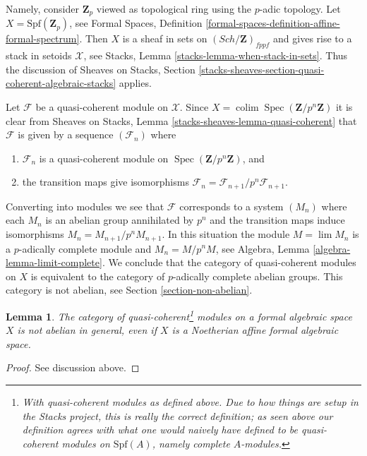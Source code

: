 \documentclass[10pt,a4paper]{amsart}
\theoremstyle{plain}
\newtheorem{lemma}[subsection]{Lemma}
\theoremstyle{definition}
\theoremstyle{remark}
\numberwithin{equation}{subsection}
\def\lim{\mathop{\mathrm{lim}}\nolimits}
\def\colim{\mathop{\mathrm{colim}}\nolimits}
\def\Spec{\mathop{\mathrm{Spec}}}
\def\Sch{\mathit{Sch}}
\begin{document}
\medskip\noindent
Namely, consider $\mathbf{Z}_p$ viewed as topological ring using
the $p$-adic topology. Let $X = \text{Spf}(\mathbf{Z}_p)$, see
Formal Spaces, Definition
\ref{formal-spaces-definition-affine-formal-spectrum}.
Then $X$ is a sheaf in sets on $(\Sch/\mathbf{Z})_{fppf}$
and gives rise to a stack in setoids $\mathcal{X}$, see 
Stacks, Lemma \ref{stacks-lemma-when-stack-in-sets}.
Thus the discussion of Sheaves on Stacks, Section
\ref{stacks-sheaves-section-quasi-coherent-algebraic-stacks}
applies. 

\medskip\noindent
Let $\mathcal{F}$ be a quasi-coherent module on $\mathcal{X}$.
Since $X = \colim \Spec(\mathbf{Z}/p^n\mathbf{Z})$ it is clear from
Sheaves on Stacks, Lemma \ref{stacks-sheaves-lemma-quasi-coherent}
that $\mathcal{F}$ is given by a sequence $(\mathcal{F}_n)$ where
\begin{enumerate}
\item $\mathcal{F}_n$ is a quasi-coherent module on
$\Spec(\mathbf{Z}/p^n\mathbf{Z})$, and
\item the transition maps give isomorphisms
$\mathcal{F}_n = \mathcal{F}_{n + 1}/p^n\mathcal{F}_{n + 1}$.
\end{enumerate}
Converting into modules we see that $\mathcal{F}$ corresponds to a
system $(M_n)$ where each $M_n$ is an abelian group annihilated
by $p^n$ and the transition maps induce isomorphisms
$M_n = M_{n + 1}/p^n M_{n + 1}$. In this situation the module
$M = \lim M_n$ is a $p$-adically complete module and $M_n = M/p^n M$, see
Algebra, Lemma \ref{algebra-lemma-limit-complete}.
We conclude that the category of quasi-coherent modules on $X$
is equivalent to the category of $p$-adically complete
abelian groups. This category is not abelian, see
Section \ref{section-non-abelian}.

\begin{lemma}
\label{lemma-quasi-coherent-not-abelian}
The category of quasi-coherent\footnote{With quasi-coherent modules
as defined above. Due to how things are setup in the Stacks project,
this is really the correct definition; as seen above our definition
agrees with what one would naively have defined to be quasi-coherent modules
on $\text{Spf}(A)$, namely complete $A$-modules.}
modules on a formal algebraic space
$X$ is not abelian in general, even if $X$ is a Noetherian affine
formal algebraic space.
\end{lemma}

\begin{proof}
See discussion above.
\end{proof}
\end{document}
